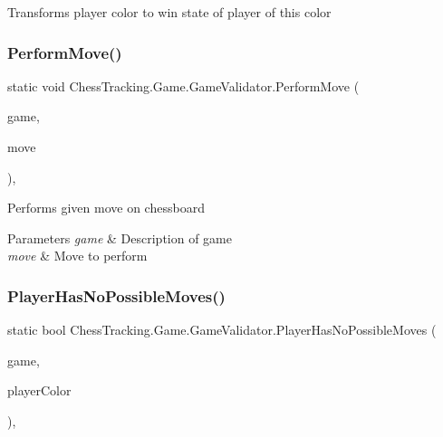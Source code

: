 Transforms player color to win state of player of this color 

\mbox{\label{class_chess_tracking_1_1_game_1_1_game_validator_aed12c92e698d54c439a7ab0293a26b48}} 
\subsubsection{\texorpdfstring{PerformMove()}{PerformMove()}}
{\footnotesize\ttfamily static void Chess\+Tracking.\+Game.\+Game\+Validator.\+Perform\+Move (\begin{DoxyParamCaption}\item[{\mbox{\hyperlink{class_chess_tracking_1_1_game_1_1_game_data}{Game\+Data}}}]{game,  }\item[{\mbox{\hyperlink{class_chess_tracking_1_1_game_1_1_game_move}{Game\+Move}}}]{move }\end{DoxyParamCaption})\hspace{0.3cm}{\ttfamily [static]}, {\ttfamily [private]}}



Performs given move on chessboard 


\begin{DoxyParams}{Parameters}
{\em game} & Description of game\\
\hline
{\em move} & Move to perform\\
\hline
\end{DoxyParams}
\mbox{\label{class_chess_tracking_1_1_game_1_1_game_validator_a9b6bedb9fa2b0a96790228c6f364e249}} 
\subsubsection{\texorpdfstring{PlayerHasNoPossibleMoves()}{PlayerHasNoPossibleMoves()}}
{\footnotesize\ttfamily static bool Chess\+Tracking.\+Game.\+Game\+Validator.\+Player\+Has\+No\+Possible\+Moves (\begin{DoxyParamCaption}\item[{\mbox{\hyperlink{class_chess_tracking_1_1_game_1_1_game_data}{Game\+Data}}}]{game,  }\item[{\mbox{\hyperlink{namespace_chess_tracking_1_1_game_ab79070a55977a8c8326e9cdda7dcfa9a}{Player\+Color}}}]{player\+Color }\end{DoxyParamCaption})\hspace{0.3cm}{\ttfamily [static]}, {\ttfamily [private]}}



